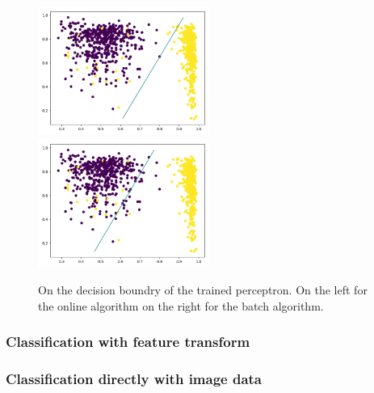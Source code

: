 \begin{figure}
\includegraphics[width = 0.5\textwidth]{figures/decision_simple_online}
\includegraphics[width = 0.5\textwidth]{figures/decision_simple_batch}
\caption{On the decision boundry of the trained perceptron. On the left for the online algorithm on the right for the batch algorithm.}
\label{perceptron:decision:simple}
\end{figure}

\subsubsection{Classification with feature transform}

\subsubsection{Classification directly with image data}

